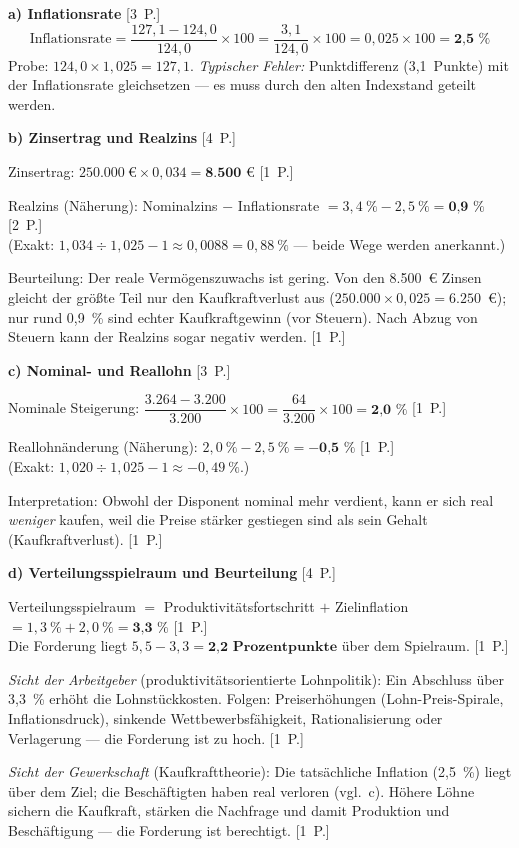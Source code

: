 \begin{loesung}[title={Lösung Aufgabe~3.2 --- Inflation, Realzins und Lohnabschluss}]
\textbf{a) Inflationsrate} \hfill [3~P.]
\[
\text{Inflationsrate} = \frac{127{,}1 - 124{,}0}{124{,}0} \times 100
= \frac{3{,}1}{124{,}0} \times 100 = 0{,}025 \times 100 = \textbf{2{,}5~\%}
\]
Probe: $124{,}0 \times 1{,}025 = 127{,}1$. \emph{Typischer Fehler:} Punktdifferenz
(3,1~Punkte) mit der Inflationsrate gleichsetzen --- es muss durch den alten Indexstand
geteilt werden.

\medskip
\textbf{b) Zinsertrag und Realzins} \hfill [4~P.]

Zinsertrag: $250.000~\text{€} \times 0{,}034 = \textbf{8.500~€}$ [1~P.]

Realzins (Näherung): Nominalzins $-$ Inflationsrate $= 3{,}4~\% - 2{,}5~\% =
\textbf{0{,}9~\%}$ [2~P.]\\
{\small (Exakt: $1{,}034 \div 1{,}025 - 1 \approx 0{,}0088 = 0{,}88~\%$ --- beide Wege
werden anerkannt.)}

Beurteilung: Der reale Vermögenszuwachs ist gering. Von den 8.500~€ Zinsen gleicht der
größte Teil nur den Kaufkraftverlust aus ($250.000 \times 0{,}025 = 6.250$~€); nur rund
0,9~\% sind echter Kaufkraftgewinn (vor Steuern). Nach Abzug von Steuern kann der
Realzins sogar negativ werden. [1~P.]

\medskip
\textbf{c) Nominal- und Reallohn} \hfill [3~P.]

Nominale Steigerung: $\dfrac{3.264 - 3.200}{3.200} \times 100 = \dfrac{64}{3.200} \times 100
= \textbf{2{,}0~\%}$ [1~P.]

Reallohnänderung (Näherung): $2{,}0~\% - 2{,}5~\% = \textbf{$-$0{,}5~\%}$ [1~P.]\\
{\small (Exakt: $1{,}020 \div 1{,}025 - 1 \approx -0{,}49~\%$.)}

Interpretation: Obwohl der Disponent nominal mehr verdient, kann er sich real
\emph{weniger} kaufen, weil die Preise stärker gestiegen sind als sein Gehalt
(Kaufkraftverlust). [1~P.]

\medskip
\textbf{d) Verteilungsspielraum und Beurteilung} \hfill [4~P.]

Verteilungsspielraum $=$ Produktivitätsfortschritt $+$ Zielinflation
$= 1{,}3~\% + 2{,}0~\% = \textbf{3{,}3~\%}$ [1~P.]\\
Die Forderung liegt $5{,}5 - 3{,}3 = \textbf{2{,}2~Prozentpunkte}$ über dem Spielraum.
[1~P.]

\emph{Sicht der Arbeitgeber} (produktivitätsorientierte Lohnpolitik): Ein Abschluss über
3,3~\% erhöht die Lohnstückkosten. Folgen: Preiserhöhungen (Lohn-Preis-Spirale,
Inflationsdruck), sinkende Wettbewerbsfähigkeit, Rationalisierung oder Verlagerung
--- die Forderung ist zu hoch. [1~P.]

\emph{Sicht der Gewerkschaft} (Kaufkrafttheorie): Die tatsächliche Inflation (2,5~\%)
liegt über dem Ziel; die Beschäftigten haben real verloren (vgl.~c). Höhere Löhne
sichern die Kaufkraft, stärken die Nachfrage und damit Produktion und Beschäftigung
--- die Forderung ist berechtigt. [1~P.]
\end{loesung}

